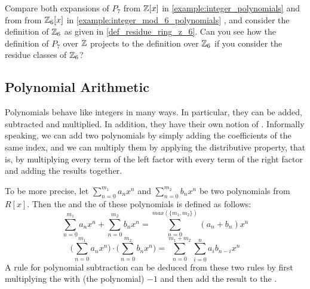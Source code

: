 \begin{exercise}
Compare both expansions of $P_7$ from $\mathbb{Z}[x]$ in \examplename{} \ref{example:integer_polynomials} and from  from $\mathbb{Z}_6[x]$ in \examplename{} \ref{example:integer_mod_6_polynomials} , and consider the definition of $\mathbb{Z}_6$ as given in \examplename{} \ref{def_residue_ring_z_6}. Can you see how the definition of $P_7$ over $\mathbb{Z}$ projects to the definition over $\mathbb{Z}_6$ if you consider the residue classes of $\mathbb{Z}_6$?
\end{exercise}
\subsection{Polynomial Arithmetic}
Polynomials behave like integers in many ways. In particular, they can be added, subtracted and multiplied. In addition, they have their own notion of . Informally speaking, we can add two polynomials  by simply adding the coefficients of the same index, and we can multiply them by applying the distributive property, that is, by multiplying every term of the left factor with every term of the right factor and adding the results together.

To be more precise, let $ \sum _{n = 0} ^{m_1}{a} _{n}{x} ^{n} $ and
$ \sum _{n = 0} ^{m_2}{b} _{n}{x^n} $ be two polynomials from $ R[x]$. Then the  and the  of these polynomials is defined as follows:
\begin{equation}
\label{def:polynomial_arithmetic}
\sum _{n = 0} ^{m_1}{a} _{n}{x} ^{n} + \sum _{n = 0} ^{m_2}{b} _{n}{x } ^{n} = \sum _{n = 0} ^{max(\{m_1,m_2\})}{({a} _{n} +{b} _{n})}{x} ^{n}
\end{equation}
\begin{equation}
\label{def:polynomial_arithmetic_mul}
\bigg (\sum _{n = 0} ^{m_1}{a} _{n}{x} ^{n} \bigg) \cdot \bigg (\sum _{n = 0} ^{m_2 }{b} _{n}{x} ^{n} \bigg) = \sum _{n = 0} ^{m_1+m_2} \sum _{i = 0} ^{n}{a} _{i }{{b} _{n-i}}{x} ^{n}
\end{equation}
A rule for polynomial subtraction can be deduced from these two rules by first multiplying the  with (the polynomial) $-1$ and then add the result to the .

